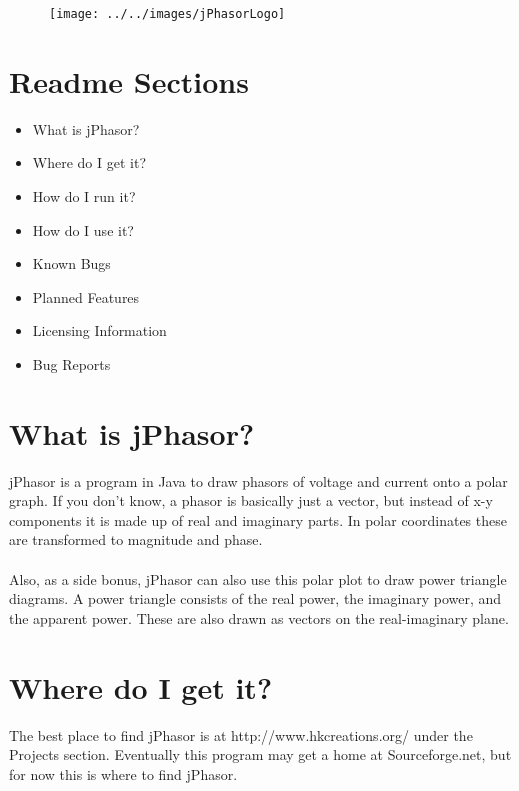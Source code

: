 \documentclass[10pt]{article}
\begin{document}

\begin{figure}[H]
	\begin{center}
	\texttt{[image: ../../images/jPhasorLogo]}
	\end{center}
\end{figure}

\section*{Readme Sections}
\begin{itemize}
	\item What is jPhasor?
	\item Where do I get it?
	\item How do I run it?
	\item How do I use it?
	\item Known Bugs
	\item Planned Features
	\item Licensing Information
	\item Bug Reports
\end{itemize}

\section*{What is jPhasor?}
jPhasor is a program in Java to draw phasors of voltage and current onto a polar graph. 
If you don't know, a phasor is basically just a vector, but instead of x-y components it is 
made up of real and imaginary parts. In polar coordinates these are transformed to magnitude and phase.
\\ \\
Also, as a side bonus, jPhasor can also use this polar plot to draw power triangle diagrams. 
A power triangle consists of the real power, the imaginary power, and the apparent power. 
These are also drawn as vectors on the real-imaginary plane.

\section*{Where do I get it?}
The best place to find jPhasor is at http://www.hkcreations.org/ under the Projects section.
Eventually this program may get a home at Sourceforge.net, but for now this is where to find
jPhasor.
\end{document}
